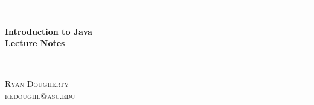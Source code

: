 \documentclass[11pt]{llncs}
\newcommand{\HRule}{\rule{\linewidth}{0.5mm}}
\begin{document}
\begin{center}



\HRule \\[0.4cm]
{ \huge \bfseries Introduction to Java \\ Lecture Notes \\[0.4cm] }

\HRule \\[1.5cm]

\textsc{Ryan Dougherty \\
\href{mailto:redoughe@asu.edu}{redoughe@asu.edu}
}


\end{center}
%
\tableofcontents

%
\newpage
\newpage
\newpage
\newpage
\newpage
\newpage
\newpage
\newpage
\newpage
\newpage
\newpage
\newpage

\end{document}
